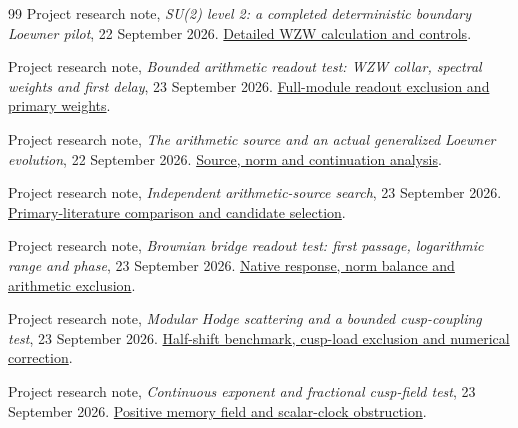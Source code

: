 \begin{thebibliography}{99}
Project research note, \emph{SU(2) level 2: a completed deterministic
boundary Loewner pilot}, 22 September 2026.
\href{../notes/SU2_LEVEL2_DETERMINISTIC_LOEWNER_PILOT_20260922.md}{Detailed WZW calculation and controls}.

Project research note, \emph{Bounded arithmetic readout test: WZW
collar, spectral weights and first delay}, 23 September 2026.
\href{notes/BOUNDED_ARITHMETIC_READOUT_TEST_20260923.md}{Full-module readout exclusion and primary weights}.

Project research note, \emph{The arithmetic source and an actual
generalized Loewner evolution}, 22 September 2026.
\href{../notes/ARITHMETIC_SOURCE_AND_GENERALIZED_LOEWNER_EVOLUTION_20260922.md}{Source, norm and continuation analysis}.

Project research note, \emph{Independent arithmetic-source search},
23 September 2026.
\href{notes/INDEPENDENT_ARITHMETIC_SOURCE_SEARCH_20260923.md}{Primary-literature comparison and candidate selection}.

Project research note, \emph{Brownian bridge readout test: first
passage, logarithmic range and phase}, 23 September 2026.
\href{notes/BROWNIAN_BRIDGE_READOUT_TEST_20260923.md}{Native response, norm balance and arithmetic exclusion}.

Project research note, \emph{Modular Hodge scattering and a bounded
cusp-coupling test}, 23 September 2026.
\href{notes/MODULAR_HODGE_SCATTERING_AND_CUSP_COUPLING_TEST_20260923.md}{Half-shift benchmark, cusp-load exclusion and numerical correction}.

Project research note, \emph{Continuous exponent and fractional
cusp-field test}, 23 September 2026.
\href{notes/CONTINUOUS_EXPONENT_AND_FRACTIONAL_CUSP_TEST_20260923.md}{Positive memory field and scalar-clock obstruction}.
\end{thebibliography}
